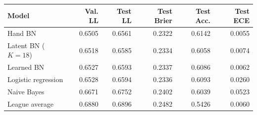 \begin{tabular}{lrrrrr}
\toprule
Model & Val. LL & Test LL & Test Brier & Test Acc. & Test ECE\\
\midrule
Hand BN & 0.6505 & 0.6561 & 0.2322 & 0.6142 & 0.0055\\
Latent BN ($K=18$) & 0.6518 & 0.6585 & 0.2334 & 0.6058 & 0.0074\\
Learned BN & 0.6527 & 0.6593 & 0.2337 & 0.6086 & 0.0062\\
Logistic regression & 0.6528 & 0.6594 & 0.2336 & 0.6093 & 0.0260\\
Naive Bayes & 0.6671 & 0.6752 & 0.2402 & 0.6039 & 0.0523\\
League average & 0.6880 & 0.6896 & 0.2482 & 0.5426 & 0.0060\\
\bottomrule
\end{tabular}

